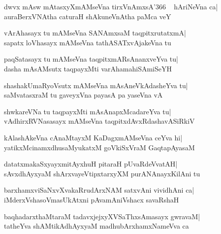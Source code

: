 \documentclass[twoside,12pt,openright]{book}
\newcounter{shloka}[chapter]
\begin{document}
\begin{shloka}%
dwvx mAsw mAtasxyXmAMseVna tirxVnAmxsA\char'366 ~ hAriNeVna ca|\\
auraBerxVNAtha caturaH shAkuneVnAtha paMca veY
\end{shloka}

\begin{shloka}%
vArAhasayx tu mAMseVna SANAmxsaM taqpitxrutatxmA|\\
sapatx loVhasayx mAMseVna tathASATxvAjakeVna tu
\end{shloka}

\begin{shloka}%
paqSatasayx tu mAMseVna taqpitxmARsAnanxveYva tu|\\
dasha mAsAMsutx taqpayxMti varAhamahiSAmiSeYH
\end{shloka}

\begin{shloka}%
shashakUmaRyoVsutx mAMseVna mAsAneVkAdasheYva tu|\\
saMvatasxraM tu gaveyxVna payasA pa yaseVna vA
\end{shloka}

\begin{shloka}%
shwkareVNa tu taqpayxMti mAsAnapxMcadareYva tu|\\
vAdhirxRVNasasayx mAMseVna taqpitxdAvxRdashavASiRkiV
\end{shloka}

\begin{shloka}%
kAlashAkeVna cAnaMtayxM KaDagxmAMseVna ceYva hi|\\
yatikxMcinamxdhusaMyukatxM goVkiSxVraM GaqtapAyasaM
\end{shloka}

\begin{shloka}%
datatxmakaSxyayxmitAyxhuH pitaraH pUvaRdeVvatAH|\\
sAvxdhAyxyaM shArxvayeVtipxtarxyXM purANAnayxKilAni tu
\end{shloka}

\begin{shloka}%
barxhamxviSaNxvXvakaRrudArxNAM satxvAni vividhAni ca|\\
iMderxVshasoVmasUkAtxni pAvamAniVshacx savaRshaH
\end{shloka}

\begin{shloka}%
baqhadarxthaMtaraM tadavxjejxyXVSaThxsAmasayx gwravaM|\\
tatheYva shAMtikAdhAyxyaM madhubArxhamxNameVva ca
\end{shloka}
\end{document}
